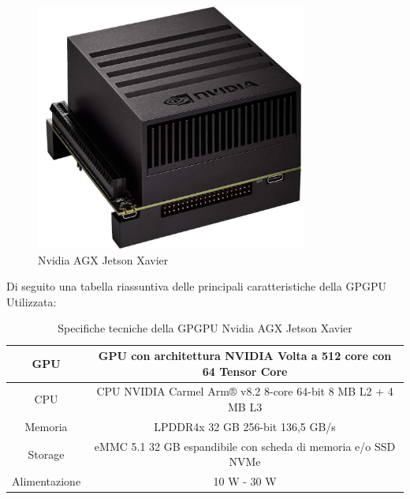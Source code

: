 \begin{figure}[H]
  \centering
  \includegraphics[width=0.8\textwidth]{figures/xavier.jpg}
  \caption{Nvidia AGX Jetson Xavier}
  \label{Nvidia AGX Jetson Xavier}
\end{figure}

\noindent Di seguito una tabella riassuntiva delle principali caratteristiche della GPGPU Utilizzata:
\setlength{\tabcolsep}{10pt} %
\setlength{\arraystretch}{1.5} %
\begin{center}
  \begin{table}[H]
  \centering
    \begin{tabular}{|c|c|}
      \hline 
      GPU& GPU con architettura NVIDIA Volta a 512 core con 64 Tensor Core \\
      \hline 
      CPU& CPU NVIDIA Carmel Arm® v8.2 8-core 64-bit 8 MB L2 + 4 MB L3 \\
      \hline 
      Memoria& LPDDR4x 32 GB 256-bit 136,5 GB/s \\
      \hline
      Storage& eMMC 5.1 32 GB espandibile con scheda di memoria e/o SSD NVMe \\ 
      \hline
      Alimentazione& 10 W - 30 W \\
      \hline
    \end{tabular}
    \caption{Specifiche tecniche della GPGPU Nvidia AGX Jetson Xavier\cite{jetson_xavier}}
  \end{table}
\end{center}

